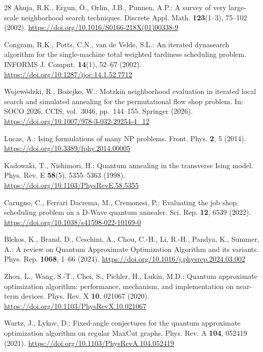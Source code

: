 \documentclass{svproc}
\newcommand{\doiurl}[1]{\mbox{\url{https://doi.org/#1}}}
\newif\ifblind
\newcommand{\rev}[1]{{\color{blue}#1}}
\newcommand{\rev}[1]{#1}
\begin{document}
\begin{thebibliography}{28}
Ahuja, R.K., Ergun, \"{O}., Orlin, J.B., Punnen, A.P.: A survey of very
large-scale neighborhood search techniques. Discrete Appl. Math.
\textbf{123}(1--3), 75--102 (2002).
\doiurl{10.1016/S0166-218X(01)00338-9}

Congram, R.K., Potts, C.N., van de Velde, S.L.: An iterated dynasearch
algorithm for the single-machine total weighted tardiness scheduling
problem. INFORMS J. Comput. \textbf{14}(1), 52--67 (2002).
\doiurl{10.1287/ijoc.14.1.52.7712}

\ifblind
[Authors omitted for blind review]: Motzkin neighborhood evaluation in
iterated local search and simulated annealing for the permutational
flow shop problem. In: SOCO 2026, CCIS, vol.\ 3046, pp.\ 144--155.
Springer (2026)
\else
Wojew\'{o}dzki, R., Bo\.{z}ejko, W.: Motzkin neighborhood evaluation in
iterated local search and simulated annealing for the permutational
flow shop problem. In: SOCO 2026, CCIS, vol.\ 3046, pp.\ 144--155.
Springer (2026). \doiurl{10.1007/978-3-032-29254-4_12}
\fi

Lucas, A.: Ising formulations of many NP problems. Front. Phys.
\textbf{2}, 5 (2014). \doiurl{10.3389/fphy.2014.00005}

Kadowaki, T., Nishimori, H.: Quantum annealing in the transverse Ising
model. Phys. Rev. E \textbf{58}(5), 5355--5363 (1998).
\doiurl{10.1103/PhysRevE.58.5355}

\rev{Carugno, C., Ferrari Dacrema, M., Cremonesi, P.: Evaluating the job shop
scheduling problem on a D-Wave quantum annealer. Sci. Rep. \textbf{12}, 6539
(2022). \doiurl{10.1038/s41598-022-10169-0}}

\rev{Blekos, K., Brand, D., Ceschini, A., Chou, C.-H., Li, R.-H., Pandya, K.,
Summer, A.: A review on Quantum Approximate Optimization Algorithm and its
variants. Phys. Rep. \textbf{1068}, 1--66 (2024).
\doiurl{10.1016/j.physrep.2024.03.002}}

Zhou, L., Wang, S.-T., Choi, S., Pichler, H., Lukin, M.D.: Quantum
approximate optimization algorithm: performance, mechanism, and
implementation on near-term devices. Phys. Rev. X \textbf{10}, 021067
(2020). \doiurl{10.1103/PhysRevX.10.021067}

Wurtz, J., Lykov, D.: Fixed-angle conjectures for the quantum approximate
optimization algorithm on regular MaxCut graphs. Phys. Rev. A
\textbf{104}, 052419 (2021).
\doiurl{10.1103/PhysRevA.104.052419}


\end{thebibliography}
\end{document}
